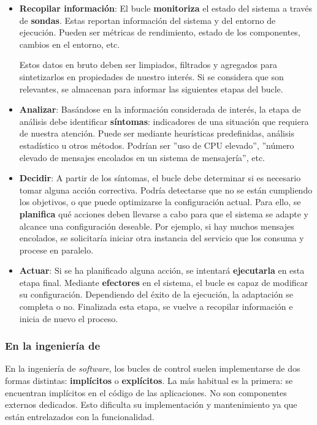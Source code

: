 \begin{itemize}
  \item \textbf{Recopilar información}: El bucle \textbf{monitoriza} el estado del sistema a través de \textbf{sondas}. Estas reportan información del sistema y del entorno de ejecución. Pueden ser métricas de rendimiento, estado de los componentes, cambios en el entorno, etc.

  Estos datos en bruto deben ser limpiados, filtrados y agregados para sintetizarlos en propiedades de nuestro interés. Si se considera que son relevantes, se almacenan para informar las siguientes etapas del bucle.

  \item \textbf{Analizar}: Basándose en la información considerada de interés, la etapa de análisis debe identificar \textbf{síntomas}: indicadores de una situación que requiera de nuestra atención. Puede ser mediante heurísticas predefinidas, análisis estadístico u otros métodos. Podrían ser ''uso de CPU elevado'', ''número elevado de mensajes encolados en un sistema de mensajería'', etc.

  \item \textbf{Decidir}: A partir de los síntomas, el bucle debe determinar si es necesario tomar alguna acción correctiva. Podría detectarse que no se están cumpliendo los objetivos, o que puede optimizarse la configuración actual. Para ello, se \textbf{planifica} qué acciones deben llevarse a cabo para que el sistema se adapte y alcance una configuración deseable. Por ejemplo, si hay muchos mensajes encolados, se solicitaría iniciar otra instancia del servicio que los consuma y procese en paralelo.

  \item \textbf{Actuar}: Si se ha planificado alguna acción, se intentará \textbf{ejecutarla} en esta etapa final. Mediante \textbf{efectores} en el sistema, el bucle es capaz de modificar su configuración. Dependiendo del éxito de la ejecución, la adaptación se completa o no. Finalizada esta etapa, se vuelve a recopilar información e inicia de nuevo el proceso.
\end{itemize}

\subsubsection{En la ingeniería de }

En la ingeniería de \emph{software}, los bucles de control suelen implementarse de dos formas distintas: \textbf{implícitos} o \textbf{explícitos}. La más habitual es la primera: se encuentran implícitos en el código de las aplicaciones. \cite{brunEngineeringSelfAdaptiveSystems2009} No son componentes externos dedicados. Esto dificulta su implementación y mantenimiento ya que están entrelazados con la funcionalidad.

